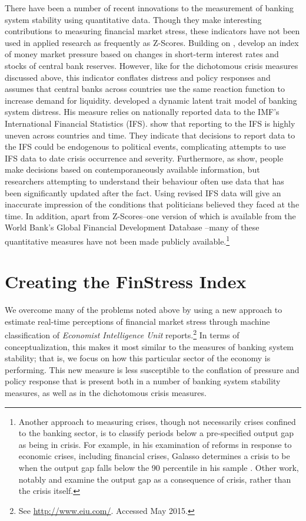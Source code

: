 \documentclass[]{article}
\begin{document}
There have been a number of recent innovations to the measurement of banking system stability using quantitative data. Though they make interesting contributions to measuring financial market stress, these indicators have not been used in applied research as frequently as Z-Scores. Building on \cite{vonHagen2007}, \cite{Jing2015} develop an index of money market pressure based on changes in short-term interest rates and stocks of central bank reserves. However, like for the dichotomous crisis measures discussed above, this indicator conflates distress and policy responses and assumes that central banks across countries use the same reaction function to increase demand for liquidity. \cite{Rosas2009} developed a dynamic latent trait model of banking system distress. His measure relies on nationally reported data to the IMF's International Financial Statistics (IFS). \cite{GandrudCopHal2015} show that reporting to the IFS is highly uneven across countries and time. They indicate that decisions to report data to the IFS could be endogenous to political events, complicating attempts to use IFS data to date crisis occurrence and severity. Furthermore, as \cite{KayserLeininger2015} show, people make decisions based on contemporaneously available information, but researchers attempting to understand their behaviour often use data that has been significantly updated after the fact. Using revised IFS data will give an inaccurate impression of the conditions that politicians believed they faced at the time. In addition, apart from Z-Scores--one version of which is available from the World Bank's Global Financial Development Database \citep{worldbank2013}--many of these quantitative measures have not been made publicly available.\footnote{Another approach to measuring crises, though not necessarily crises confined to the banking sector, is to classify periods below a pre-specified output gap as being in crisis. For example, in his examination of reforms in response to economic crises, including financial crises, Galasso determines a crisis to be when the output gap falls below the 90 percentile in his sample \citeyearpar[154]{galasso2014}. Other work, notably \cite{laeven2013} and \cite{Reinhart2009} examine the output gap as a consequence of crisis, rather than the crisis itself.}

\section{Creating the FinStress Index}

We overcome many of the problems noted above by using a new approach to estimate real-time perceptions of financial market stress through machine classification of \emph{Economist Intelligence Unit} reports.\footnote{See \url{http://www.eiu.com/}. Accessed May 2015.} In terms of conceptualization, this makes it most similar to the measures of banking system stability; that is, we focus on how this particular sector of the economy is performing. This new measure is less susceptible to the conflation of pressure and policy response that is present both in a number of banking system stability measures, as well as in the dichotomous crisis measures.
\end{document}
